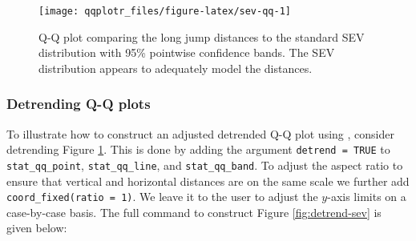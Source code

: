 \begin{Schunk}
\begin{figure}

{\centering \texttt{[image: qqplotr\_files/figure-latex/sev-qq-1]} 

}

\caption[Q-Q plot comparing the long jump distances to the standard SEV distribution with 95\% pointwise confidence bands]{Q-Q plot comparing the long jump distances to the standard SEV distribution with 95\% pointwise confidence bands. The SEV distribution appears to adequately model the distances.}\label{fig:sev-qq}
\end{figure}
\end{Schunk}

\FloatBarrier

\subsubsection{Detrending Q-Q plots}\label{detrending-q-q-plots}

\label{sec:detrending}

To illustrate how to construct an adjusted detrended Q-Q plot using
, consider detrending Figure \ref{fig:sev-qq}. This is done
by adding the argument \texttt{detrend\ =\ TRUE} to
\texttt{stat\_qq\_point}, \texttt{stat\_qq\_line}, and
\texttt{stat\_qq\_band}. To adjust the aspect ratio to ensure that
vertical and horizontal distances are on the same scale we further add
\texttt{coord\_fixed(ratio\ =\ 1)}. We leave it to the user to adjust
the \(y\)-axis limits on a case-by-case basis. The full command to
construct Figure \ref{fig:detrend-sev} is given below:

